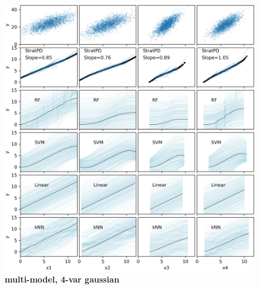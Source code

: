 \documentclass[12pt]{article}
\begin{document}
\begin{figure}[htbp]
\begin{center}
\includegraphics[scale=0.6]{images/multivar_multimodel_normal.png}
\caption{{\bf  multi-model, 4-var gaussian}}
\label{fig:4var}
\end{center}
\end{figure}
\end{document}
